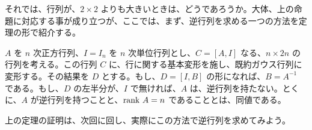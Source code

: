 それでは、行列が、$2\times 2$ よりも大きいときは、どうであろうか。大体、上の命題に対応する事が成り立つが、ここでは、まず、逆行列を求める一つの方法を定理の形で紹介する。

\begin{thm} \label{thm:hakidashi}
$A$ を $n$ 次正方行列、$I = I_n$ を $n$ 次単位行列とし、$C = [A, I]$ なる、$n\times 2n$ の行列を考える。この行列 $C$ に、行に関する基本変形を施し、既約ガウス行列に変形する。その結果を  $D$ とする。もし、$D = [I, B]$ の形になれば、$B = A^{-1}$ である。もし、$D$ の左半分が、$I$ で無ければ、$A$ は、逆行列を持たない。とくに、$A$ が逆行列を持つことと、$\mbox{{\rm rank }} A = n$ であることとは、同値である。
\end{thm}

上の定理の証明は、次回に回し、実際にこの方法で逆行列を求めてみよう。

